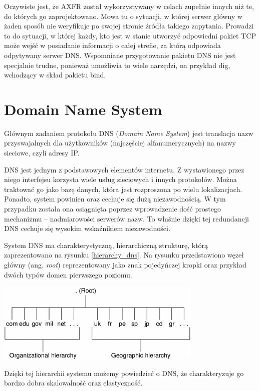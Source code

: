 Oczywiste jest, że AXFR został wykorzystywany w celach zupełnie innych niż te, do których go zaprojektowano. Mowa tu o sytuacji, w której serwer główny w żaden sposób nie weryfikuje po swojej stronie źródła takiego zapytania. Prowadzi to do sytuacji, w której każdy, kto jest w stanie utworzyć odpowiedni pakiet TCP może wejść w posiadanie informacji o całej strefie, za którą odpowiada odpytywany serwer DNS. Wspomniane przygotowanie pakietu DNS nie jest specjalnie trudne, ponieważ umożliwia to wiele narzędzi, na przykład dig, wchodzący w skład pakietu bind. 

\section{Domain Name System}
Głównym zadaniem protokołu DNS (\textit{Domain Name System}) jest translacja nazw przyswajalnych dla użytkowników (najczęściej alfanumerycznych) na nazwy sieciowe, czyli adresy IP. 

DNS jest jednym z podstawowych elementów internetu. Z wystawionego przez niego interfejsu korzysta wiele usług sieciowych i innych protokołów. Można traktować go jako bazę danych, która jest rozproszona po wielu lokalizacjach. Ponadto, system powinien oraz cechuje się dużą niezawodnością. W tym przypadku została ona osiągnięta poprzez wprowadzenie dość prostego mechanizmu -- nadmiarowości serwerów nazw. To właśnie dzięki tej redundancji DNS cechuje się wysokim wskaźnikiem niezawodności.

System DNS ma charakterystyczną, hierarchiczną strukturę, którą zaprezentowano na rysunku \ref{hierarchy_dns}. Na rysunku przedstawiono węzeł główny (ang. \textit{root}) reprezentowany jako znak pojedyńczej kropki oraz przykład dwóch typów domen pierwszego poziomu.

\begin{center}
	\includegraphics[scale=1]{image/hierarchy_dns}\label{hierarchy_dns}
\end{center}

Dzięki tej hierarchii systemu możemy powiedzieć o DNS, że charakteryzuje go bardzo dobra skalowalność oraz elastyczność. 

